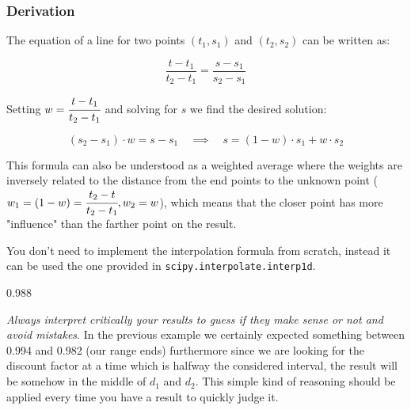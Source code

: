 \begin{attention}
\subsubsection{Derivation}
The equation of a line for two points $(t_1, s_1)$ and $(t_2, s_2)$ can be written as:

\begin{equation}
\frac{t - t_1}{t_2 - t_1} = \frac{s - s_1}{s_2 - s_1}
\end{equation}

Setting $w = \cfrac{t - t_1}{t_2 - t_1}$ and solving for $s$ we find the desired solution:

\begin{equation}
(s_2 - s_1)\cdot w = s - s_1\quad\implies\quad s = (1 - w)\cdot s_1 + w \cdot s_2
\end{equation}

This formula can also be understood as a weighted average where the weights are inversely related to the distance from the end points to the unknown point ($w_1 = (1 - w) = \cfrac{t_2 - t}{t_2 -t_1}, w_2 = w$), which means that the closer point has more "influence" than the farther point on the result.
\end{attention}

You don't need to implement the interpolation formula from scratch, instead it can be used the one provided in \texttt{scipy.interpolate.interp1d}. 


\begin{ioutput}
0.988
\end{ioutput}

\emph{Always interpret critically your results to guess if they make sense or not and avoid mistakes}. In the previous example we certainly expected something between 0.994 and 0.982 (our range ends) furthermore since we are looking for the discount factor at a time which is halfway the considered interval, the result will be somehow in the middle of $d_1$ and $d_2$. This simple kind of reasoning should be applied every time you have a result to quickly judge it.

